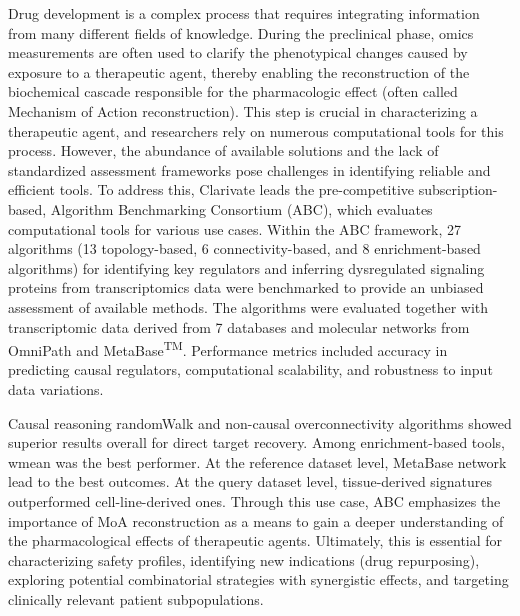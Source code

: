 ﻿%

%

Drug development is a complex process that requires integrating information from many different fields of knowledge.
During the preclinical phase, omics measurements are often used to clarify the phenotypical changes caused by exposure to a therapeutic agent, thereby enabling the reconstruction of the biochemical cascade responsible for the pharmacologic effect (often called Mechanism of Action reconstruction).
This step is crucial in characterizing a therapeutic agent, and researchers rely on numerous computational tools for this process.
However, the abundance of available solutions and the lack of standardized assessment frameworks pose challenges in identifying reliable and efficient tools.
To address this, Clarivate leads the pre-competitive subscription-based, Algorithm Benchmarking Consortium (ABC), which evaluates computational tools for various use cases.
Within the ABC framework, 27 algorithms (13 topology-based, 6 connectivity-based, and 8 enrichment-based algorithms) for identifying key regulators and inferring dysregulated signaling proteins from transcriptomics data were benchmarked to provide an unbiased assessment of available methods.
The algorithms were evaluated together with transcriptomic data derived from 7 databases and molecular networks from OmniPath and  MetaBase\textsuperscript{TM}.
Performance metrics included accuracy in predicting causal regulators, computational scalability, and robustness to input data variations.

Causal reasoning randomWalk and non-causal overconnectivity algorithms showed superior results overall for direct target recovery. Among enrichment-based tools, wmean was the best performer.
At the reference dataset level, MetaBase network lead to the best outcomes. At the query dataset level, tissue-derived signatures outperformed cell-line-derived ones.
Through this use case, ABC emphasizes the importance of MoA reconstruction as a means to gain a deeper understanding of the pharmacological effects of therapeutic agents. Ultimately, this is essential for characterizing safety profiles, identifying new indications (drug repurposing), exploring potential combinatorial strategies with synergistic effects, and targeting clinically relevant patient subpopulations.

